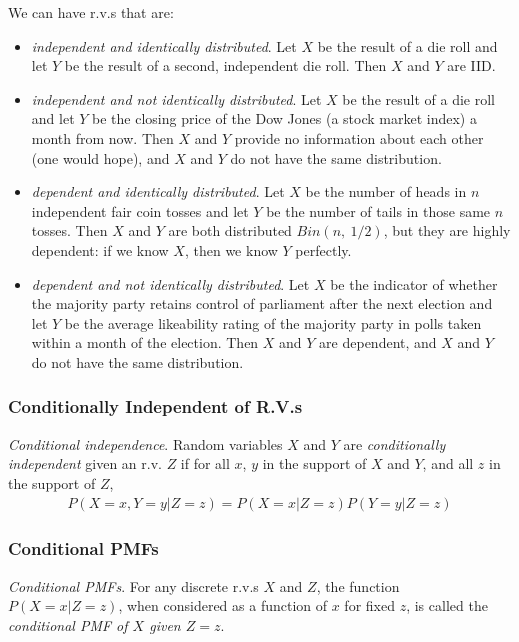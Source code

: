We can have r.v.s that are:
\begin{itemize}
\item
\emph{independent and identically distributed}. 
Let \(X\) be the result of a die roll and let \(Y\) be the result of a second,
independent die roll. 
Then \(X\) and \(Y\) are IID.
\item
\emph{independent and not identically distributed}. 
Let \(X\) be the result of a die roll and let \(Y\) be 
the closing price of the Dow Jones (a stock market index) a month from now. 
Then \(X\) and \(Y\) provide no information about each other (one would hope),
and \(X\) and \(Y\) do not have the same distribution.
\item
\emph{dependent and identically distributed}. 
Let \(X\) be the number of heads in \(n\) independent fair coin tosses 
and let \(Y\) be the number of tails in those same \(n\) tosses. 
Then \(X\) and \(Y\) are both distributed \(Bin(n,\ 1/2)\), 
but they are highly dependent: if we know \(X\), 
then we know \(Y\) perfectly.
\item
\emph{dependent and not identically distributed}. 
Let \(X\) be the indicator of whether the majority party retains control of parliament
after the next election and 
let \(Y\) be the average likeability rating of the majority party in polls 
taken within a month of the election. 
Then \(X\) and \(Y\) are dependent, 
and \(X\) and \(Y\) do not have the same distribution.
\end{itemize}

\subsubsection{Conditionally Independent of R.V.s}

\emph{Conditional independence}. 
Random variables \(X\) and \(Y\) are \emph{conditionally independent} given an r.v. \(Z\) if for
all \(x\), \(y\) in the support of \(X\) and \(Y\), and all \(z\) in the support of \(Z\),
\begin{align}
P\left( X = x,Y = y | Z = z \right) = P\left( X = x | Z = z \right)P(Y = y|Z = z)
\end{align}

\subsubsection{Conditional PMFs}

\emph{Conditional PMFs}. 
For any discrete r.v.s \(X\) and \(Z\), 
the function \(P(X = x|Z = z)\), 
when considered as a function of \(x\) for fixed \(z\), 
is called the \emph{conditional PMF of \(X\) given \(Z = z\)}.

